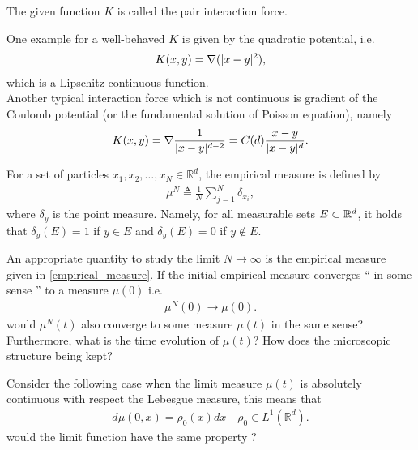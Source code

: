 The given function $K$ is called the pair interaction force.
\begin{example}
One example for a well-behaved $K$ is given by the quadratic potential, i.e.
\begin{align*}
  K(x,y) =  \nabla (\lvert x-y\rvert^2),
\end{align*}
which is a Lipschitz continuous function. \\[1ex]
Another typical interaction force which is not continuous 
is gradient of the Coulomb potential (or the fundamental solution of Poisson equation), namely 
\begin{align*}
  K(x,y) = \nabla \frac{1}{\lvert x-y\rvert^{d-2}} = C(d) \frac{x-y}{\lvert x-y\rvert^{d} }
.\end{align*}
\end{example}
\begin{definition}\label{empirical_measure}
 For a set of particles $x_{1},x_{2},\ldots,x_N \in \mathbb{R}^{d}$, the empirical measure is defined by 
 \begin{align*}
   \mu^{N} \triangleq \frac{1}{N} \sum_{j=1}^{N} \delta_{x_i}, 
 \end{align*}
where $\delta_y$ is the point measure. Namely, for all measurable sets $E\subset \mathbb{R}^d$, it holds that $\delta_y(E)=1$ if $y\in E$ and $\delta_y(E)=0$ if $y\not\in E$.
\end{definition}

An appropriate quantity to study the limit $N \to  \infty$ is the empirical measure given in \ref{empirical_measure}. If the initial empirical measure converges `` in some sense '' to a measure $\mu(0)$ i.e. 
\begin{align*}
  \mu^{N}(0) \to \mu(0)
.\end{align*}
would $\mu^N(t)$ also converge to some measure $\mu(t)$ in the same sense?
Furthermore, what is the time evolution of $\mu(t)$? How does the microscopic structure being kept?\\[1ex]
\begin{note}
  Consider the following case when the limit measure $\mu(t)$ is absolutely continuous with respect the Lebesgue measure, this means that 
\begin{align*}
  d\mu(0,x) = \rho_0(x) dx \quad \rho_0 \in  L^{1}(\mathbb{R}^{d} ) 
.\end{align*}
would the limit function have the same property ?
\end{note}

